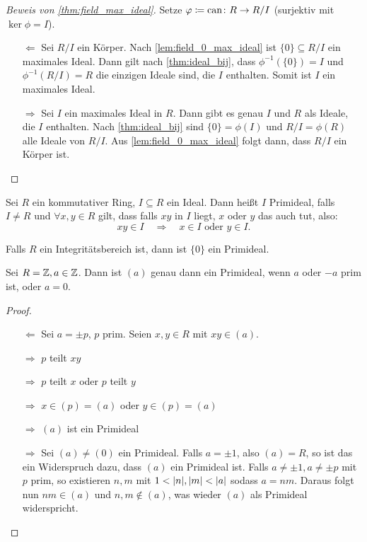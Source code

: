 \documentclass[12pt,a4paper]{scrartcl}
\begin{document}
\begin{proof}[Beweis von \cref{thm:field_max_ideal}] %
	Setze $\varphi \coloneqq \operatorname{can} \colon R\to R/I$ (surjektiv mit $\ker\phi = I$).
	\begin{itemize}
		\item [\glqq $\Leftarrow$\grqq ] Sei $R/I$ ein Körper. Nach \cref{lem:field_0_max_ideal} ist $\{0\}\subseteq R/I$ ein maximales Ideal. Dann gilt nach \cref{thm:ideal_bij}, dass $\phi^{-1}(\{0\}) = I$ und $\phi^{-1}(R/I) = R$ die einzigen Ideale sind, die $I$ enthalten. Somit ist $I$ ein maximales Ideal.
		\item[\glqq$\Rightarrow$\grqq] Sei $I$ ein maximales Ideal in $R$. Dann gibt es genau $I$ und $R$ als Ideale, die $I$ enthalten.
		Nach \cref{thm:ideal_bij} sind $\{0\} = \phi(I)$ und $R/I = \phi(R)$ alle Ideale von $R/I$. Aus \cref{lem:field_0_max_ideal} folgt dann, dass $R/I$ ein Körper ist.
  \qedhere
	\end{itemize}
\end{proof}

\begin{defi}
	Sei $R$ ein kommutativer Ring, $I\subseteq R$ ein Ideal. Dann heißt $I$ Primideal, falls $I\neq R$ und $\forall x, y\in R$ gilt, dass falls $xy$ in $I$ liegt, $x$ oder $y$ das auch tut, also: \[xy\in I \quad \Longrightarrow \quad x\in I\text{ oder }y\in I.\]
\end{defi}
\begin{bem}
	Falls $R$ ein Integritätsbereich ist, dann ist $\{0\}$ ein Primideal.
\end{bem}

\begin{bsp}
	Sei $R = \mathbb Z, a\in \mathbb Z$. Dann ist $(a)$ genau dann ein Primideal, wenn $a$ oder $-a$ prim ist, oder $a = 0$.
\end{bsp}
\begin{proof}
	\leavevmode
	\begin{itemize}
		\item [\glqq $\Leftarrow$\grqq ]Sei $a = \pm p$, $p$ prim. Seien $x,y\in R$ mit $xy\in (a)$.

		$\Rightarrow$ $p$ teilt $xy$

		$\Rightarrow$ $p$ teilt $x$ oder $p$ teilt $y$

		$\Rightarrow$ $x\in (p) = (a)$ oder $y\in (p) = (a)$

		$\Rightarrow$ $(a)$ ist ein Primideal
		\item [\glqq $\Rightarrow$\grqq ] Sei $(a) \neq (0)$ ein Primideal. Falls $a = \pm 1$, also $ (a) = R$, so ist das ein Widerspruch dazu, dass $(a)$ ein Primideal ist. Falls $a \neq \pm 1, a\neq \pm p$ mit $p$ prim, so existieren $n, m$ mit $1<\lvert n\rvert, \lvert m\rvert<\lvert a\rvert$ sodass $a = nm$. 
		Daraus folgt nun $ nm\in (a)$ und $n,m\notin (a)$, was wieder $(a)$ als Primideal widerspricht.
  \qedhere
	\end{itemize}
\end{proof}
\end{document}
